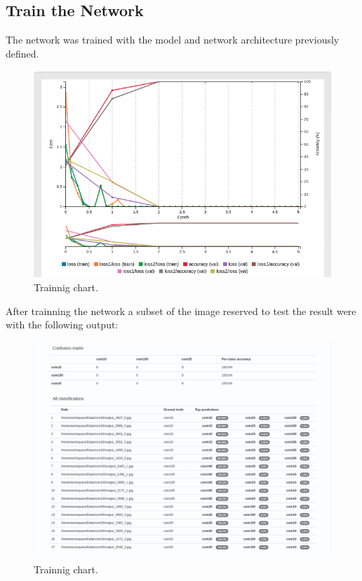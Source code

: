 \documentclass[10pt,journal,compsoc]{IEEEtran}
\begin{document}
\subsection{Train the Network}

The network was trained with the model and network architecture previously defined.

\begin{figure}[h]
\centering
\includegraphics[scale=0.3]{trainning-chart}
\caption{Trainnig chart.}
\label{fig:figure3}
\end{figure}

After trainning the network a subset of the image reserved to test the result were  with the following output:

\begin{figure}[h]
\centering
\includegraphics[scale=0.2]{trainning-validation}
\caption{Trainnig chart.}
\label{fig:figure3}
\end{figure}
\end{document}
